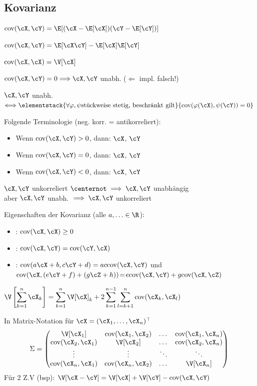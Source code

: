 \subsection{Kovarianz}
\shortdefinition $\cov(\cX, \cY) = \E[(\cX - \E[\cX])(\cY - \E[\cY])]$

\shortremark $\cov(\cX, \cY) = \E[\cX \cY] - \E[\cX] \E[\cY]$

\shortremark $\cov(\cX, \cX) = \V[\cX]$

\shortremark $\cov(\cX, \cY) = 0 \Longrightarrow \cX, \cY$ unabh. ($\Leftarrow$ impl. falsch!)

\shortremark $\cX, \cY$ unabh. $\Longleftrightarrow \elementstack{\forall \varphi, \psi \text{stückweise stetig, beschränkt gilt}}{\cov(\varphi(\cX), \psi(\cY)) = 0}$

\shortremark Folgende Terminologie (neg. korr. = antikorreliert):
\begin{itemize}
    \item Wenn $\cov(\cX, \cY) > 0$, dann: $\cX$, $\cY$ 
    \item Wenn $\cov(\cX, \cY) = 0$, dann: $\cX$, $\cY$ 
    \item Wenn $\cov(\cX, \cY) < 0$, dann: $\cX$, $\cY$ 
\end{itemize}

\shortexample $\cX, \cY$ unkorreliert $\centernot\implies \cX, \cY$ unabhängig\\
aber $\cX, \cY$ unabh. $\implies \cX, \cY$ unkorreliert

\shortremark Eigenschaften der Kovarianz (alle $a, \ldots \in \R$):
\begin{itemize}
    \item {}: $\cov(\cX, \cX) \geq 0$
    \item {}: $\cov(\cX, \cY) = \cov(\cY, \cX)$
    \item {}: $\cov(a\cX + b, c\cY + d) = ac \cov(\cX, \cY)$ und\\
          $\cov(\cX, (e \cY + f) + (g \cZ + h))\! =\! e \cov(\cX, \cY) + g \cov(\cX, \cZ)$
\end{itemize}

\shortremark $\displaystyle \V\left[ \sum_{k = 1}^{n} \cX_k \right] = \sum_{k = 1}^{n} \V[\cX]_k + 2 \sum_{k = 1}^{n - 1} \sum_{l = k + 1}^{n} \cov(\cX_k, \cX_l)$

\shortremark In Matrix-Notation für $\vec{\cX} = (\cX_1, \ldots, \cX_n)^\top$
\[
    \Sigma = \begin{pmatrix}
        \V[\cX_1]          & \cov(\cX_1, \cX_2) & \dots  & \cov(\cX_1, \cX_n) \\
        \cov(\cX_2, \cX_1) & \V[\cX_2]          & \dots  & \cov(\cX_2, \cX_n) \\
        \vdots             & \vdots             & \ddots & \ddots             \\
        \cov(\cX_n, \cX_1) & \cov(\cX_n, \cX_2) & \dots  & \V[\cX_n]          \\
    \end{pmatrix}
\]
Für 2 Z.V (bsp): $\V[\cX - \cY] = \V[\cX] + \V[\cY] - \cov(\cX, \cY)$
